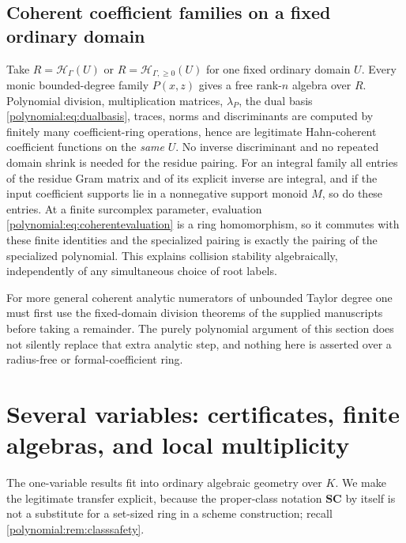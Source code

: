 \documentclass[11pt,letterpaper]{article}
\numberwithin{equation}{section}
\theoremstyle{definition}
\theoremstyle{remark}\newtheorem{remark}[theorem]{Remark}
\newcommand{\SC}{\mathbf{SC}}
\newcommand{\HH}{\mathscr H_\Gamma}
\newcommand{\HHn}{\mathscr H_{\Gamma,\ge0}}
\begin{document}
\subsection{Coherent coefficient families on a fixed ordinary domain}
\label{polynomial:subsec:coherentfamilies}
Take $R=\HH(U)$ or $R=\HHn(U)$ for one fixed ordinary domain $U$. Every monic
bounded-degree family $P(x,z)$ gives a free rank-$n$ algebra over $R$.
Polynomial division, multiplication matrices, $\lambda_P$, the dual basis
\eqref{polynomial:eq:dualbasis}, traces, norms and discriminants are computed
by finitely many coefficient-ring operations, hence are legitimate
Hahn-coherent coefficient functions on the \emph{same} $U$. No inverse
discriminant and no repeated domain shrink is needed for the residue pairing.
For an integral family all entries of the residue Gram matrix and of its
explicit inverse are integral, and if the input coefficient supports lie in a
nonnegative support monoid $M$, so do these entries. At a finite surcomplex
parameter, evaluation \eqref{polynomial:eq:coherentevaluation} is a ring
homomorphism, so it commutes with these finite identities and the specialized
pairing is exactly the pairing of the specialized polynomial. This explains
collision stability algebraically, independently of any simultaneous choice of
root labels.

For more general coherent analytic numerators of unbounded Taylor degree one
must first use the fixed-domain division theorems of the supplied manuscripts
before taking a remainder. The purely polynomial argument of this section does
not silently replace that extra analytic step, and nothing here is asserted
over a radius-free or formal-coefficient ring.

\section{Several variables: certificates, finite algebras, and local
multiplicity}\label{polynomial:sec:multivariate}
The one-variable results fit into ordinary algebraic geometry over $K$. We
make the legitimate transfer explicit, because the proper-class notation
$\SC$ by itself is not a substitute for a set-sized ring in a scheme
construction; recall \cref{polynomial:rem:classsafety}.
\end{document}
